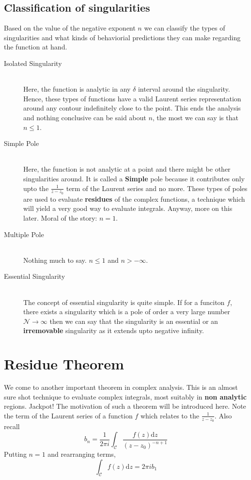 \documentclass[11pt]{article}
\begin{document}
\begin{sloppypar}
\subsection{Classification of singularities}
Based on the value of the negative exponent $n$ we can classify the types of singularities and what kinds of behaviorial predictions they can make regarding the function at hand. 
\begin{description}
\item[Isolated Singularity] \hfill \\
	Here, the function is analytic in any $\delta$ interval around the singularity. Hence, these types of functions have a valid Laurent series representation around any contour indefinitely close to the point. This ends the analysis and nothing conclusive can be said about $n$, the most we can say is that $n \leq 1$.
\item[Simple Pole] \hfill \\
	Here, the function is not analytic at a point and there might be other singularities around. It is called a \textbf{Simple} pole because it contributes only upto the $\frac{1}{z-z_{0}}$ term of the Laurent series and no more. These types of poles are used to evaluate \textbf{residues} of the complex functions, a technique which will yield a very good way to evaluate integrals. Anyway, more on this later. Moral of the story: $n = 1$.
\item[Multiple Pole] \hfill \\
	Nothing much to say. $n \leq 1$ and $n > -\infty$.
\item[Essential Singularity] \hfill \\
	The concept of essential singularity is quite simple. If for a funciton $f$, there exists a singularity which is a pole of order a very large number $\mathcal{N} \to \infty$ then we can say that the singularity is an essential or an \textbf{irremovable} singularity as it extends upto negative infinity. 
\end{description}

\section{Residue Theorem}
We come to another important theorem in complex analysis. This is an almost sure shot technique to evaluate complex integrals, most suitably in \textbf{non analytic} regions. Jackpot! The motivation of such a theorem will be introduced here. Note the term of the Laurent series of a function $f$ which relates to the $\frac{1}{z-z_{0}}$. Also recall
$$b_{n} = \frac{1}{2\pi i}\int_{\mathcal{C}}\frac{f(z)\mathrm{d}z}{(z-z_{0})^{-n+1}}$$
Putting $n=1$ and rearranging terms,
$$\int_{\mathcal{C}}f(z)\mathrm{d}z = 2\pi ib_{1}$$


\end{sloppypar}
\end{document}
